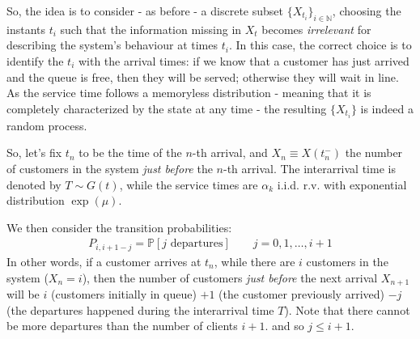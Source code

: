 \documentclass[../template.tex]{subfiles}
\begin{document}
\medskip

So, the idea is to consider - as before - a discrete subset $\{X_{t_i}\}_{i \in \mathbb{N}}$, choosing the instants $t_i$ such that the information missing in $X_{t}$ becomes \textit{irrelevant} for describing the system's behaviour at times $t_i$. In this case, the correct choice is to identify the $t_i$ with the arrival times: if we know that a customer has just arrived and the queue is free, then they will be served; otherwise they will wait in line. As the service time follows a memoryless distribution - meaning that it is completely characterized by the state at any time - the resulting $\{X_{t_i}\}$ is indeed a random process.

\medskip

So, let's fix $t_n$ to be the time of the $n$-th arrival, and $X_n \equiv X(t_{n}^-)$ the number of customers in the system \textit{just before} the $n$-th arrival. The interarrival time is denoted by $T \sim G(t)$, while the service times are $\alpha_k$ i.i.d. r.v. with exponential distribution $\exp(\mu)$.

\medskip

We then consider the transition probabilities:
\begin{align}\label{eqn:t-prob-queue}
    P_{i, i+1-j} = \mathbb{P}[j \text{ departures}] \qquad j = 0, 1, \dots, i+1
\end{align}
In other words, if a customer arrives at $t_n$, while there are $i$ customers in the system ($X_n = i$), then the number of customers \textit{just before} the next arrival $X_{n+1}$ will be $i$ (customers initially in queue) $+ 1$ (the customer previously arrived) $-j$ (the departures happened during the interarrival time $T$). Note that there cannot be more departures than the number of clients $i+1$. and so $j \leq i+1$.  
\end{document}
